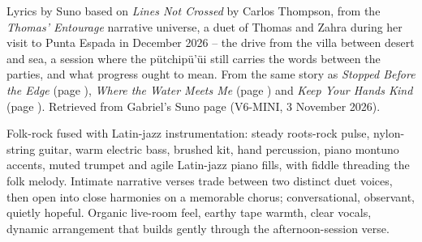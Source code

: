 
\label{sec:dont-mistake-the-bridge-for-home}
\begin{notes}
Lyrics by Suno based on \emph{Lines Not Crossed} by Carlos Thompson, from the \emph{Thomas' Entourage} narrative universe, a duet of Thomas and Zahra during her visit to Punta Espada in December 2026 -- the drive from the villa between desert and sea, a session where the pütchipü'üi still carries the words between the parties, and what progress ought to mean. From the same story as \emph{Stopped Before the Edge} (page \pageref{sec:stopped-before-the-edge}), \emph{Where the Water Meets Me} (page \pageref{sec:where-the-water-meets-me}) and \emph{Keep Your Hands Kind} (page \pageref{sec:keep-your-hands-kind}). Retrieved from Gabriel's Suno page (V6-MINI, 3 November 2026).
\end{notes}
\begin{style}
Folk-rock fused with Latin-jazz instrumentation: steady roots-rock pulse, nylon-string guitar, warm electric bass, brushed kit, hand percussion, piano montuno accents, muted trumpet and agile Latin-jazz piano fills, with fiddle threading the folk melody. Intimate narrative verses trade between two distinct duet voices, then open into close harmonies on a memorable chorus; conversational, observant, quietly hopeful. Organic live-room feel, earthy tape warmth, clear vocals, dynamic arrangement that builds gently through the afternoon-session verse.
\end{style}
